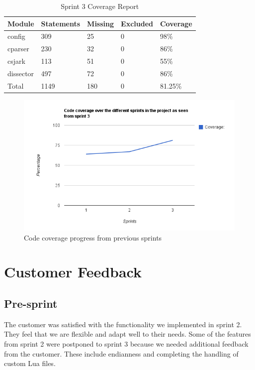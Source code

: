 \begin{table}[!htb]\footnotesize\center
	\caption{Sprint 3 Coverage Report\label{tab:sp3CoverageReport}}
	\begin{tabular}{l l l l l}
		\toprule
		Module & Statements & Missing & Excluded & Coverage\\
		\midrule
		config & 309 & 25 & 0 & 98\%\ \\
		cparser & 230 & 32 & 0 & 86\%\ \\
		csjark & 113 & 51 & 0 & 55\%\ \\
		dissector & 497 & 72 & 0 & 86\%\ \\
		Total & 1149 & 180  & 0 & 81.25\%\ \\
		\bottomrule
	\end{tabular}
\end{table}

\begin{figure}[ht]
	\center
	\includegraphics[width=\textwidth]{./sprints/img/sprint3_code_coverage_chart.png}
	\caption{Code coverage progress from previous sprints\label{fig:sp3CoverageChart}}
\end{figure}


\section{Customer Feedback}

\subsection{Pre-sprint}

The customer was satisfied with the functionality we implemented in sprint 2.
They feel that we are flexible and adapt well to their needs.
Some of the features from sprint 2 were postponed to sprint 3 because we needed additional feedback from the customer.
These include endianness and completing the handling of custom Lua files.


